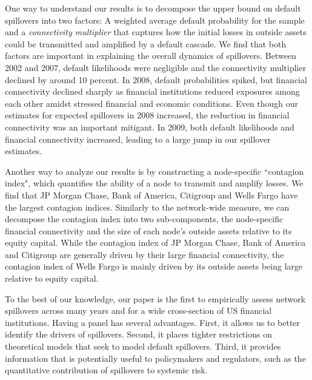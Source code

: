 One way to understand our results is to decompose the upper bound on default spillovers into two factors: A weighted average default probability for the sample and a \textit{connectivity multiplier} that captures how the initial losses in outside assets could be transmitted and amplified by a default cascade. We find that both factors are important in explaining the overall dynamics of spillovers. Between 2002 and 2007, default likelihoods were negligible and the connectivity multiplier declined by around 10 percent. In 2008, default probabilities spiked, but financial connectivity declined sharply as financial institutions reduced exposures among each other amidst stressed financial and economic conditions. Even though our estimates for expected spillovers in 2008 increased, the reduction in financial connectivity was an important mitigant. In 2009, both default likelihoods and financial connectivity increased, leading to a large jump in our spillover estimates.

Another way to analyze our results is by constructing a node-specific ``contagion index", which quantifies the ability of a node to transmit and amplify losses. We find that JP Morgan Chase, Bank of America, Citigroup and Wells Fargo have the largest contagion indices. Similarly to the network-wide measure, we can decompose the contagion index into two sub-components, the node-specific financial connectivity and the size of each node's outside assets relative to its equity capital. While the contagion index of JP Morgan Chase, Bank of America and Citigroup are generally driven by their large financial connectivity, the contagion index of Wells Fargo is mainly driven by its outside assets being large relative to equity capital. 

To the best of our knowledge, our paper is the first to empirically assess network spillovers across many years and for a wide cross-section of US financial institutions. Having a panel has several advantages. First, it allows us to better identify the drivers of spillovers. Second, it places tighter restrictions on theoretical models that seek to model default spillovers. Third, it provides information that is potentially useful to policymakers and regulators, such as the quantitative contribution of spillovers to systemic risk.

